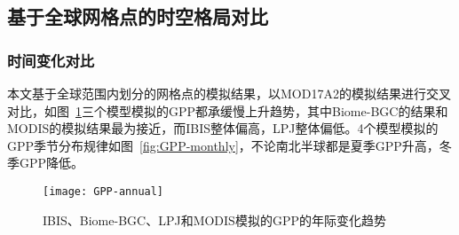 

\subsection{基于全球网格点的时空格局对比}
\subsubsection{时间变化对比}
本文基于全球范围内划分的网格点的模拟结果，以MOD17A2的模拟结果进行交叉对比，如图~\ref{fig:GPP-annual}三个模型模拟的GPP都承缓慢上升趋势，其中Biome-BGC的结果和MODIS的模拟结果最为接近，而IBIS整体偏高，LPJ整体偏低。4个模型模拟的GPP季节分布规律如图~\ref{fig:GPP-monthly}，不论南北半球都是夏季GPP升高，冬季GPP降低。

\begin{figure}[!htbp]
    \centering
    \texttt{[image: GPP-annual]}
    \caption{IBIS、Biome-BGC、LPJ和MODIS模拟的GPP的年际变化趋势}
    \label{fig:GPP-annual}
\end{figure}

